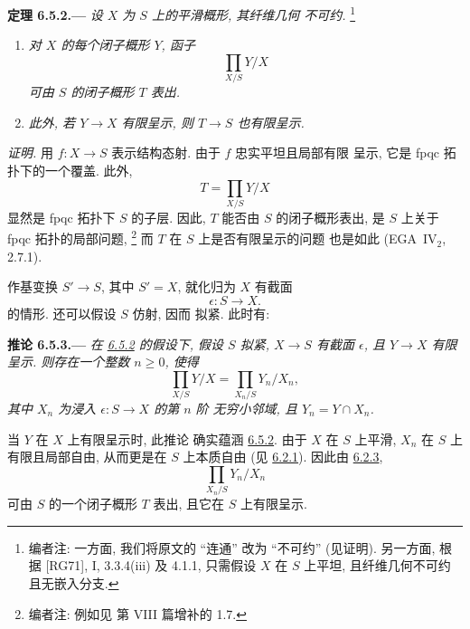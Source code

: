
\medskip
{}\label{thm:sga3-VIB-6.5.2}%
\noindent\textbf{定理 6.5.2.---}
\emph{设 \(X\) 为 \(S\) 上的平滑概形, 其纤维几何
不可约.}%
\footnote{\label{note:sga3-VIB-62}编者注: 一方面,
我们将原文的 ``连通'' 改为
``不可约'' (见证明). 另一方面, 根据
[RG71], I, 3.3.4\textup{(iii)} 及 4.1.1, 只需假设
\(X\) 在 \(S\) 上平坦, 且纤维几何不可约
且无嵌入分支.}
\begin{enumerate}
\item[\textup{(i)}]\label{concl:sga3-VIB-6.5.2-i}
  \emph{对 \(X\) 的每个闭子概形 \(Y\), 函子
  \[
    \prod_{X/S}Y/X
  \]
  可由 \(S\) 的闭子概形 \(T\) 表出.}
\item[\textup{(ii)}]\label{concl:sga3-VIB-6.5.2-ii}
  \emph{此外, 若 \(Y\to X\) 有限呈示, 则
  \(T\to S\) 也有限呈示.}
\end{enumerate}

\emph{证明.}
用 \(f:X\to S\) 表示结构态射. 由于 \(f\)
忠实平坦且局部有限
呈示, 它是 fpqc 拓扑下的一个覆盖. 此外,
\[
  T=\prod_{X/S}Y/X
\]
显然是 fpqc 拓扑下 \(S\) 的子层. 因此,
\(T\) 能否由 \(S\) 的闭子概形表出,
是 \(S\) 上关于 fpqc 拓扑的局部问题,%
\footnote{\label{note:sga3-VIB-63}编者注: 例如见
第 VIII 篇增补的 1.7.}
而 \(T\) 在 \(S\) 上是否有限呈示的问题
也是如此 (EGA~IV\(_2\), 2.7.1).

作基变换 \(S'\to S\), 其中 \(S'=X\), 就化归为
\(X\) 有截面
\[
  \epsilon:S\longrightarrow X.
\]
的情形. 还可以假设 \(S\) 仿射, 因而
拟紧. 此时有:

\medskip
{}\label{cor:sga3-VIB-6.5.3}%
\noindent\textbf{推论 6.5.3.---}
\emph{在 \hyperref[thm:sga3-VIB-6.5.2]{6.5.2} 的假设下,
假设 \(S\) 拟紧, \(X\to S\) 有截面 \(\epsilon\),
且 \(Y\to X\) 有限呈示.
则存在一个整数 \(n\geq0\), 使得}
\label{eq:sga3-VIB-6.5.3-infinitesimal}%
\[
  \prod_{X/S}Y/X
  =
  \prod_{X_n/S}Y_n/X_n,
\]
\emph{其中 \(X_n\) 为浸入 \(\epsilon:S\to X\) 的第 \(n\) 阶
无穷小邻域, 且
\(Y_n=Y\cap X_n\).}

当 \(Y\) 在 \(X\) 上有限呈示时, 此推论
确实蕴涵 \hyperref[thm:sga3-VIB-6.5.2]{6.5.2}.
由于 \(X\) 在 \(S\) 上平滑, \(X_n\) 在 \(S\) 上有限且局部自由,
从而更是在 \(S\) 上本质自由
(见 \hyperref[def:sga3-VIB-6.2.1]{6.2.1}). 因此由
\hyperref[thm:sga3-VIB-6.2.3]{6.2.3},
\[
  \prod_{X_n/S}Y_n/X_n
\]
可由 \(S\) 的一个闭子概形 \(T\) 表出,
且它在 \(S\) 上有限呈示.

